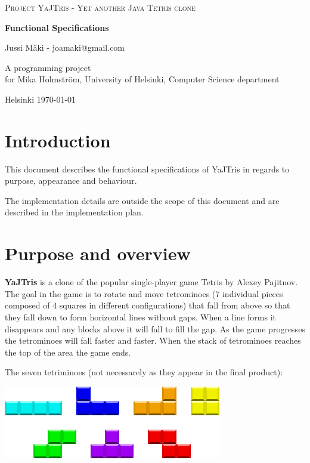 \documentclass[11pt,a4paper]{article}
\begin{document}
\begin{titlepage}
  \begin{center} \sloppy
    \large \textsc{Project YaJTris - Yet another Java Tetris clone }
    \vfill

    \huge \textbf{Functional Specifications} \vfill 

    \LARGE Jussi Mäki - joamaki@gmail.com
    \vspace{3mm}
    
    A programming project\\
    for Mika Holmström, University of Helsinki, Computer Science department

    \vfill

    Helsinki \today

  \end{center}
\end{titlepage}

\section {Introduction}

This document describes the functional specifications of YaJTris in regards to 
purpose, appearance and behaviour.

The implementation details are outside the scope of this document and are described in the 
implementation plan.

\section {Purpose and overview}

{\bf YaJTris} is a clone of the popular single-player game Tetris by Alexey Pajitnov. 
The goal in the game is to rotate and move tetrominoes (7 individual pieces composed of 4 squares in different configurations) that fall from above so that they fall down to form 
horizontal lines without gaps. When a line forms it disappears and any blocks above it 
will fall to fill the gap. As the game progresses the tetrominoes will fall faster and
faster. When the stack of tetrominoes reaches the top of the area the game ends. 

\vspace{3mm}
The seven tetriminoes (not necessarely as they appear in the final product):
\begin{center}
\includegraphics{tetrominoes.png}
\end{center}
\end{document}
